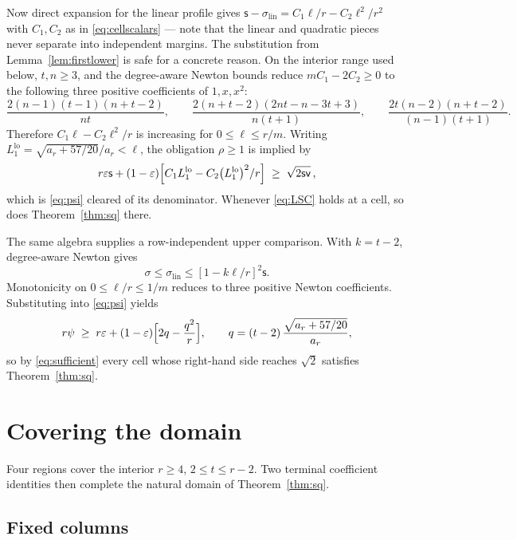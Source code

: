 \documentclass[11pt,a4paper]{article}
\theoremstyle{plain}
\theoremstyle{definition}
\theoremstyle{remark}
\newcommand{\ls}{\mathsf{s}}
\newcommand{\lv}{\mathsf{v}}
\begin{document}
Now direct expansion for the linear profile gives
$\ls-\sigma_{\mathrm{lin}}=C_1\ell/r-C_2\ell^2/r^2$ with $C_1,C_2$ as in
\eqref{eq:cellscalars} --- note that the linear and quadratic pieces never
separate into independent margins. The substitution from Lemma~\ref{lem:firstlower}
is safe for a concrete reason. On the interior range used below,
$t,n\ge3$, and the degree-aware Newton bounds reduce
$mC_1-2C_2\ge0$ to the following three positive coefficients of
$1,x,x^2$:
\[
 \frac{2(n-1)(t-1)(n+t-2)}{nt},\qquad
 \frac{2(n+t-2)(2nt-n-3t+3)}{n(t+1)},\qquad
 \frac{2t(n-2)(n+t-2)}{(n-1)(t+1)}.
\]
Therefore $C_1\ell-C_2\ell^2/r$ is increasing for
$0\le\ell\le r/m$. Writing
$L_1^{\mathrm{lo}}=\sqrt{a_r+57/20}/a_r<\ell$, the obligation $\rho\ge1$ is
implied by
\begin{equation}\label{eq:LSC}
  r\varepsilon\ls+(1-\varepsilon)
   \Bigl[C_1L_1^{\mathrm{lo}}-C_2\bigl(L_1^{\mathrm{lo}}\bigr)^2/r\Bigr]
  \;\ge\;\sqrt{2\ls\lv}\,,
\end{equation}
which is \eqref{eq:psi} cleared of its denominator. Whenever \eqref{eq:LSC}
holds at a cell, so does Theorem~\ref{thm:sq} there.

The same algebra supplies a row-independent upper comparison. With $k=t-2$,
degree-aware Newton gives
\begin{equation}\label{eq:topcomp}
  \sigma\le\sigma_{\mathrm{lin}}\le[1-k\ell/r]^2\ls .
\end{equation}
Monotonicity on
$0\le\ell/r\le1/m$ reduces to three positive Newton coefficients. Substituting
into \eqref{eq:psi} yields
\begin{equation}\label{eq:TOP}
  r\psi\;\ge\;r\varepsilon+(1-\varepsilon)\Bigl[2q-\frac{q^2}{r}\Bigr],
  \qquad q=(t-2)\,\frac{\sqrt{a_r+57/20}}{a_r},
\end{equation}
so by \eqref{eq:sufficient} every cell whose right-hand side reaches $\sqrt2$
satisfies Theorem~\ref{thm:sq}.

\section{Covering the domain}\label{sec:coverage}

Four regions cover the interior $r\ge4$, $2\le t\le r-2$. Two terminal
coefficient identities then complete the natural domain of
Theorem~\ref{thm:sq}.

\subsection{Fixed columns}
\end{document}
